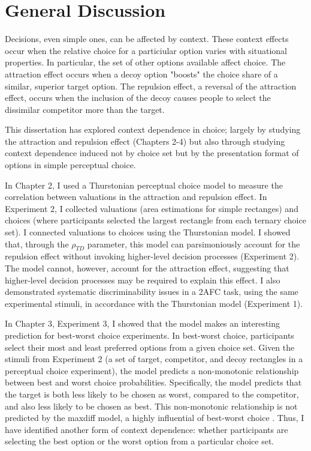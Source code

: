 \section{General Discussion}

Decisions, even simple ones, can be affected by context. These context effects occur when the relative choice for a particiular option varies with situational properties. In particular, the set of other options available affect choice. The attraction effect occurs when a decoy option "boosts" the choice share of a similar, superior target option. The repulsion effect, a reversal of the attraction effect, occurs when the inclusion of the decoy causes people to select the dissimilar competitor more than the target. 

This dissertation has explored context dependence in choice; largely by studying the attraction and repulsion effect (Chapters 2-4) but also through studying context dependence induced not by choice set but by the presentation format of options in simple perceptual choice.

In Chapter 2, I used a Thurstonian perceptual choice model \parencite{thurstone1927law} to measure the correlation between valuations in the attraction and repulsion effect. In Experiment 2, I collected valuations (area estimations for simple rectanges) and choices (where participants selected the largest rectangle from each ternary choice set). I connected valuations to choices using the Thurstonian model. I showed that, through the $\rho_{TD}$ parameter, this model can parsimoniously account for the repulsion effect without invoking higher-level decision processes (Experiment 2). The model cannot, however, account for the attraction effect, suggesting that higher-level decision processes may be required to explain this effect. I also demonstrated systematic discriminability issues in a 2AFC task, using the same experimental stimuli, in accordance with the Thurstonian model (Experiment 1).

In Chapter 3, Experiment 3, I showed that the model makes an interesting prediction for best-worst choice experiments. In best-worst choice, participants select their most and least preferred options from a given choice set. Given the stimuli from Experiment 2 (a set of target, competitor, and decoy rectangles in a perceptual choice experiment), the model predicts a non-monotonic relationship between best and worst choice probabilities. Specifically, the model predicts that the target is both less likely to be chosen as worst, compared to the competitor, and also less likely to be chosen as best. This non-monotonic relationship is not predicted by the maxdiff model, a highly influential of best-worst choice \parencite{marleyProbabilisticModelsBest2005}. Thus, I have identified another form of context dependence: whether participants are selecting the best option or the worst option from a particular choice set.

